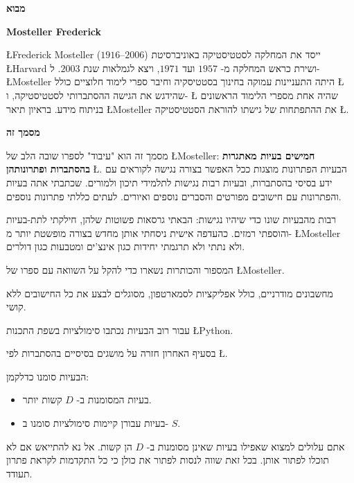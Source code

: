 \tableofcontents

\newpage

\begin{center}
\textbf{\Large מבוא}
\end{center}


\bigskip

\textbf{Mosteller Frederick}

\L{Frederick Mosteller}
($1916$--$2006$)
ייסד את המחלקה לסטטיסטיקה באוניברסיטת 
\L{Harvard}
ושירת כראש המחלקה מ-%
$1957$
ועד
$1971$,
ויצא לגמלאות שנת
$2003$.
ל-%
\L{Mosteller}
היתה התעניינות עמוקה בחינוך בסטטיסקיה וחיבר ספרי לימוד חלוציים כולל 
\L{\cite{pwsa}}
שהידגש את הגישה ההסתברותי לסטטיסטיקה, ו-%
\L{\cite{bsda}}
שהיה אחת מספרי הלימוד הראשונים בניתוח מידע. בראיון תיאר 
\L{Mosteller}
את ההתפתחות של גישתו להוראת הסטטיסטיקה
\L{\cite{gse}}.

\medskip

\textbf{מסמך זה}

מסמך זה הוא "עיבוד" לספרו שובה הלב של 
\L{Mosteller}: 
\textbf{חמישים בעיות מאתגרות בהסתברות ופתרונותהן}
\L{\cite{fifty}}.
הבעיות הפתרונות מוצגות ככל האפשר בצורה נגישה לקוראים עם ידע בסיסי בהסתברות, ובעיות רבות נגישות לתלמידי תיכון ולמורים. שכתבתי אתה בעיות והפתרונות עם חישובים מפורטים והסברים נוספים ואיורים. לעתים כללתי פתרונות נוספים.

רבות מהבעיות שונו כדי שיהיו נגישות: הבאתי גרסאות פשוטות שלהן, חילקתי לתת-בעיות והוספתי רמזים. כהעדפה אישית ניסחתי אותן מחדש בצורה מופשטת יותר מ-%
\L{Mosteller}
ולא נתתי ולא תרגמתי יחידות כגון אינצ'ים ומטבעות כגון דולרים.

המספור והכותרות נשארו כדי להקל על השוואה עם ספרו של
\L{Mosteller}.

מחשבונים מודרניים, כולל אפליקציות לסמארטפון, מסוגלים לבצע את כל החישובים ללא קושי.

עבור רוב הבעיות נכתבו סימולציות בשפת התכנות 
\L{Python}.

בסעיף האחרון חזרה על מושגים בסיסיים בהסתברות לפי
\L{\cite{ross}}.

הבעיות סומנו כדלקמן:
\begin{itemize}
\item 
בעיות המסומנות ב-%
$D$
קשות יותר.
\item
בעיות עבורן קיימות סימולציות סומנו ב-%
$S$.
\end{itemize}
אתם עלולים למצוא שאפילו בעיות שאינן מסומנות ב-%
$D$
הן קשות. אל נא להתייאש אם לא תוכלו לפתור אותן. בכל זאת שווה לנסות לפתור את כולן כי כל התקדמות לקראת פתרון תעודד.


